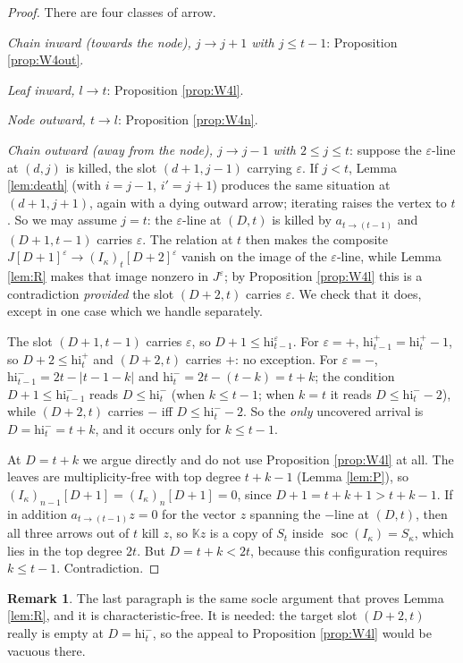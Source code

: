 \documentclass[reqno]{amsart}
\theoremstyle{plain}
\theoremstyle{definition}
\newtheorem{remark}[theorem]{Remark}
\DeclareMathOperator{\soc}{soc}
\newcommand{\ka}{\kappa}
\newcommand{\eps}{\varepsilon}
\newcommand{\hi}{\mathrm{hi}}
\begin{document}
\begin{proof}
There are four classes of arrow.

\emph{Chain inward \textup{(}towards the node\textup{)}, $j\to j+1$ with $j\le t-1$}: Proposition
\ref{prop:W4out}.

\emph{Leaf inward, $l\to t$}: Proposition \ref{prop:W4l}.

\emph{Node outward, $t\to l$}: Proposition \ref{prop:W4n}.

\emph{Chain outward \textup{(}away from the node\textup{)}, $j\to j-1$ with $2\le j\le t$}: suppose the $\eps$-line at
$(d,j)$ is killed, the slot $(d+1,j-1)$ carrying $\eps$.  If $j<t$, Lemma
\ref{lem:death} (with $i=j-1$, $i'=j+1$) produces the same situation at
$(d+1,j+1)$, again with a dying outward arrow; iterating raises the vertex to
$t$.  So we may assume $j=t$: the $\eps$-line at $(D,t)$ is killed by
$a_{t\to(t-1)}$ and $(D+1,t-1)$ carries $\eps$.  The relation at $t$ then makes
the composite $J[D+1]^\eps\to(I_\ka)_t[D+2]^\eps$ vanish on the image of the
$\eps$-line, while Lemma \ref{lem:R} makes that image nonzero in $J^{\eps}$;
by Proposition \ref{prop:W4l} this is a contradiction \emph{provided} the slot
$(D+2,t)$ carries $\eps$.  We check that it does, except in one case which we
handle separately.

The slot $(D+1,t-1)$ carries $\eps$, so $D+1\le\hi^{\eps}_{t-1}$.  For
$\eps=+$, $\hi^+_{t-1}=\hi^+_t-1$, so $D+2\le\hi^+_t$ and $(D+2,t)$ carries
$+$: no exception.  For $\eps=-$, $\hi^-_{t-1}=2t-|t-1-k|$ and
$\hi^-_t=2t-(t-k)=t+k$; the condition $D+1\le\hi^-_{t-1}$ reads $D\le\hi^-_t$
(when $k\le t-1$; when $k=t$ it reads $D\le \hi^-_t-2$), while $(D+2,t)$ carries
$-$ iff $D\le\hi^-_t-2$.  So the \emph{only} uncovered arrival is
$D=\hi^{-}_t=t+k$, and it occurs only for $k\le t-1$.

At $D=t+k$ we argue directly and do not use Proposition \ref{prop:W4l} at all.
The leaves are multiplicity-free with top degree $t+k-1$ (Lemma \ref{lem:P}),
so $(I_\ka)_{n-1}[D+1]=(I_\ka)_n[D+1]=0$, since $D+1=t+k+1>t+k-1$.  If in
addition $a_{t\to(t-1)}z=0$ for the vector $z$ spanning the $-$line at $(D,t)$,
then all three arrows out of $t$ kill $z$, so $\mathbb{K}z$ is a copy of $S_t$
inside $\soc(I_\ka)=S_\ka$, which lies in the top degree $2t$.  But
$D=t+k<2t$, because this configuration requires $k\le t-1$.  Contradiction.
\end{proof}

\begin{remark}
The last paragraph is the same socle argument that proves Lemma \ref{lem:R},
and it is characteristic-free.  It is needed: the target slot $(D+2,t)$ really
is empty at $D=\hi^-_t$, so the appeal to Proposition \ref{prop:W4l} would be
vacuous there.
\end{remark}
\end{document}
